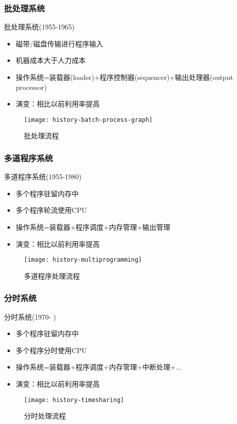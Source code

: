 \begin{frame}
	
	\frametitle{批处理系统}
	
	批处理系统(1955-1965)
	\begin{itemize}
		\item 磁带/磁盘传输进行程序输入
		\item 机器成本大于人力成本	
		\item 操作系统=装载器(loader)+程序控制器(sequencer)+输出处理器(output processor)
		\item 演变：相比以前利用率提高
	\end{itemize}
	
	\begin{figure}
		\centering
		\texttt{[image: history-batch-process-graph]}
		\caption{批处理流程}
	\end{figure}
	
\end{frame}




\begin{frame}[plain]
	
	\frametitle{多道程序系统}
	
	多道程序系统(1955-1980)
	\begin{itemize}
		\item 多个程序驻留内存中
		\item 多个程序轮流使用CPU	
		\item 操作系统=装载器+程序调度+内存管理+输出管理
		\item 演变：相比以前利用率提高
	\end{itemize}
	
	\begin{figure}
		\centering
		\texttt{[image: history-multiprogramming]}
		\caption{多道程序处理流程}
	\end{figure}
	
\end{frame}


\begin{frame}[plain]
	
	\frametitle{分时系统}
	
	分时系统(1970- )
	\begin{itemize}
		\item 多个程序驻留内存中
		\item 多个程序分时使用CPU	
		\item 操作系统=装载器+程序调度+内存管理+中断处理+...
		\item 演变：相比以前利用率提高
	\end{itemize}
	
	\begin{figure}
		\centering
		\texttt{[image: history-timesharing]}
		\caption{分时处理流程}
	\end{figure}
	
\end{frame}

